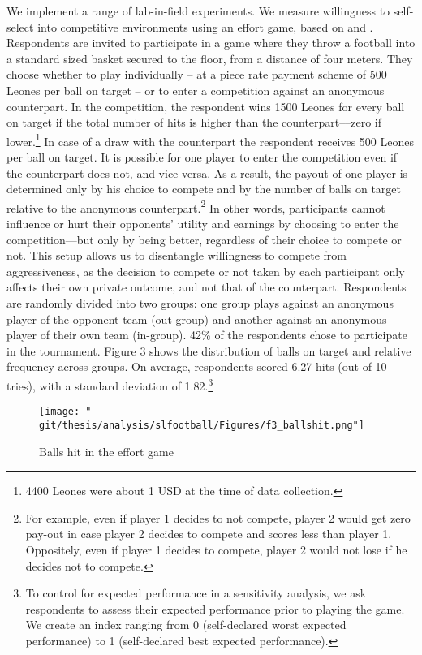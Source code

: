 We implement a range of lab-in-field experiments. We measure willingness to self-select into competitive environments using an effort game, based on \cite{Niederle2007} and \cite{Bartling2009b}. Respondents are invited to participate in a game where they throw a football into a standard sized basket secured to the floor, from a distance of four meters. They choose whether to play individually – at a piece rate payment scheme of 500 Leones per ball on target – or to enter a competition against an anonymous counterpart. In the competition, the respondent wins 1500 Leones for every ball on target if the total number of hits is higher than the counterpart––zero if lower.\footnote{4400 Leones were about 1 USD at the time of data collection.}   In case of a draw with the counterpart the respondent receives 500 Leones per ball on target. It is possible for one player to enter the competition even if the counterpart does not, and vice versa. As a result, the payout of one player is determined only by his choice to compete and by the number of balls on target relative to the anonymous counterpart.\footnote{For example, even if player 1 decides to not compete, player 2 would get zero pay-out in case player 2 decides to compete and scores less than player 1. Oppositely, even if player 1 decides to compete, player 2 would not lose if he decides not to compete.}  In other words, participants cannot influence or hurt their opponents’ utility and earnings by choosing to enter the competition—but only by being better, regardless of their choice to compete or not. This setup allows us to disentangle willingness to compete from aggressiveness, as the decision to compete or not taken by each participant only affects their own private outcome, and not that of the counterpart. Respondents are randomly divided into two groups: one group plays against an anonymous player of the opponent team (out-group) and another against an anonymous player of their own team (in-group). 42\% of the respondents chose to participate in the tournament. Figure 3 shows the distribution of balls on target and relative frequency across groups. On average, respondents scored 6.27 hits (out of 10 tries), with a standard deviation of 1.82.\footnote{To control for expected performance in a sensitivity analysis, we ask respondents to assess their expected performance prior to playing the game. We create an index ranging from 0 (self-declared worst expected performance) to 1 (self-declared best expected performance).}  

\begin{figure}[htb]
  \texttt{[image: "\\git/thesis/analysis/slfootball/Figures/f3\_ballshit.png"]}
  \caption{Balls hit in the effort game}
  \label{fig:slf:ballshit}
\end{figure}

